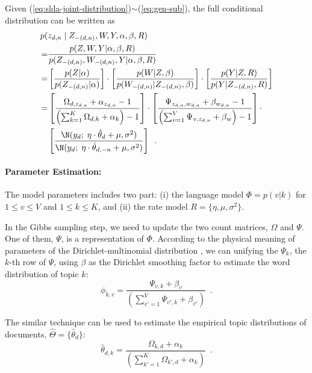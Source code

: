 Given (\ref{eq:slda-joint-distribution})$\sim$(\ref{eq:gen-sub}), the
full conditional distribution can be written as
\begin{equation}
  \label{eq:slda-full-conditional-1}
  \begin{split}
  p(& z_{d,n} \mid Z_{-(d,n)},W,Y,\alpha,\beta,R)
  \\
  =&
  \frac{
    p(Z,W,Y|\alpha,\beta,R)
  }{
    p(Z_{-(d,n)},W_{-(d,n)},Y|\alpha,\beta,R)
  }
  \\
  =&
  \left[ \frac{p(Z|\alpha)}{p(Z_{-(d,n)}|\alpha)} \right] \cdot
  \left[ \frac{p(W|Z,\beta)}{p(W_{-(d,n)}|Z_{-(d,n)},\beta)} \right] \cdot
  \left[ \frac{p(Y|Z,R)}{p(Y|Z_{-(d,n)},R)} \right]
  \\
  =&
  \left[ \frac{
    \Omega_{d,z_{d,n}} + \alpha_{z_{d,n}} - 1
  }{
    \left( \sum_{k=1}^K  \Omega_{d,k} + \alpha_k \right) - 1
  } \right]
  \cdot
  \left[ \frac{
    \Psi_{z_{d,n},w_{d,n}} + \beta_{w_{d,n}} - 1
  }{
    \left( \sum_{v=1}^V  \Psi_{v,z_{d,n}} + \beta_w \right) - 1
  } \right]
  \cdot
  \\
  &
  \left[ \frac{
    \N(y_d; \; \eta \cdot \hat{\theta}_d + \mu, \sigma^2)
  }{
    \N(y_d; \; \eta \cdot \hat{\theta}_{d,-n} + \mu, \sigma^2)
  } \right]
  \enspace.
  \end{split}
\end{equation}

\paragraph{Parameter Estimation:}
The model parameters includes two part: (i) the language model
$\Phi=p(v|k)$ for $1\leq{}v\leq{}V$ and $1\leq{}k\leq{}K$, and (ii)
the rate model $R=\{\eta,\mu,\sigma^2\}$.

In the Gibbs sampling step, we need to update the two count matrices,
$\Omega$ and $\Psi$.  One of them, $\Psi$, is a representation of
$\Phi$.  According to the physical meaning of parameters of the
Dirichlet-multinomial distribution \cite{prml}, we can unifying the
$\Psi_k$, the $k$-th row of $\Psi$, using $\beta$ as the Dirichlet
smoothing factor to estimate the word distribution of topic $k$:
\begin{equation}
  \label{eq:read-out-final}
  \phi_{k,v}
  =
  \frac{
    \Psi_{v,k} + \beta_{v}
  }{
    \left( \sum_{v'=1}^V  \Psi_{v',k} + \beta_{v'} \right)
  }
  \enspace.
\end{equation}

The similar technique can be used to estimate the empirical topic
distributions of documents, $\hat\Theta=\{\hat\theta_d\}$:
\begin{equation}
  \hat\theta_{d,k}
  =
  \frac{
    \Omega_{k,d} + \alpha_k
  }{
    \left( \sum_{k'=1}^K  \Omega_{k',d} + \alpha_k \right)
  }
  \enspace.
\end{equation}

